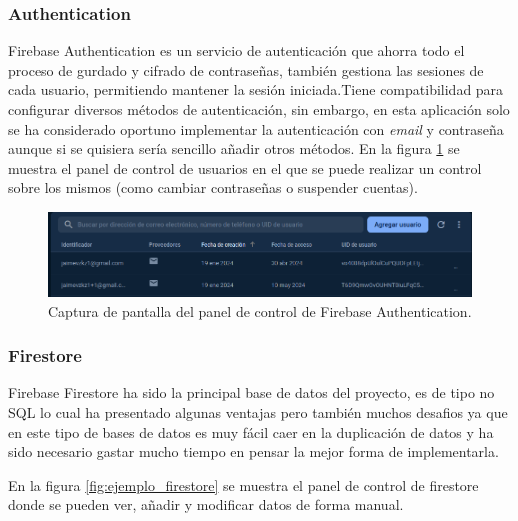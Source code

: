 \subsubsection{Authentication}
\label{subsec:firebaseAuth}
Firebase Authentication\hyperlink{cap:biblio}{} es un servicio de autenticación que ahorra todo el proceso de gurdado y cifrado de contraseñas, también gestiona las sesiones de cada usuario, permitiendo mantener la sesión iniciada.Tiene compatibilidad para configurar diversos métodos de autenticación, sin embargo, en esta aplicación solo se ha considerado oportuno implementar la autenticación con \textit{email} y contraseña aunque si se quisiera sería sencillo añadir otros métodos. En la figura \ref{fig:ejemplo_auth} se muestra el panel de control de usuarios en el que se puede realizar un control sobre los mismos (como cambiar contraseñas o suspender cuentas).
\begin{figure}[h]
    \centering
    \includegraphics[width = 1\textwidth]{Imagenes/Fuentes/ejemplo_auth.png}
    \caption{Captura de pantalla del panel de control de Firebase Authentication.}
    \label{fig:ejemplo_auth}
\end{figure}
\hypertarget{subsec:firestore}{}
\subsubsection{Firestore} 
Firebase Firestore \hyperlink{cap:biblio}{} ha sido la principal base de datos del proyecto, es de tipo no SQL lo cual ha presentado algunas ventajas pero también muchos desafios ya que en este tipo de bases de datos es muy fácil caer en la duplicación de datos y ha sido necesario gastar mucho tiempo en pensar la mejor forma de implementarla. 

En la figura \ref{fig:ejemplo_firestore} se muestra el panel de control de firestore donde se pueden ver, añadir y modificar datos de forma manual. 


